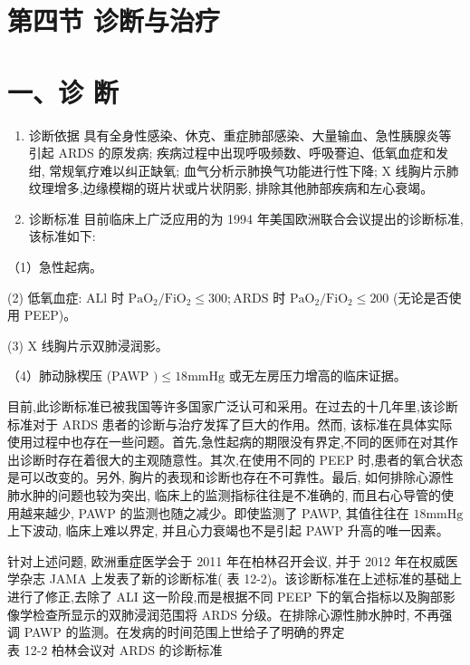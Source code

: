 \documentclass[10pt]{article}
\begin{document}
\section*{第四节 诊断与治疗}
\section*{一、诊 断}
\begin{enumerate}
  \item 诊断依据 具有全身性感染、休克、重症肺部感染、大量输血、急性胰腺炎等引起 ARDS 的原发病; 疾病过程中出现呼吸频数、呼吸謇迫、低氧血症和发绀, 常规氧疗难以纠正缺氧; 血气分析示肺换气功能进行性下降; X 线胸片示肺纹理增多,边缘模糊的斑片状或片状阴影, 排除其他肺部疾病和左心衰竭。

  \item 诊断标准 目前临床上广泛应用的为 1994 年美国欧洲联合会议提出的诊断标准,该标准如下:

\end{enumerate}

（1）急性起病。

(2) 低氧血症: $\mathrm{ALl}$ 时 $\mathrm{PaO}_{2} / \mathrm{FiO}_{2} \leqslant 300 ; \mathrm{ARDS}$ 时 $\mathrm{PaO}_{2} / \mathrm{FiO}_{2} \leqslant 200$ (无论是否使用 PEEP)。

(3) X 线胸片示双肺浸润影。

（4）肺动脉楔压 (PAWP $) \leqslant 18 \mathrm{mmHg}$ 或无左房压力增高的临床证据。

目前,此诊断标准已被我国等许多国家广泛认可和采用。在过去的十几年里,该诊断标准对于 ARDS 患者的诊断与治疗发挥了巨大的作用。然而, 该标准在具体实际使用过程中也存在一些问题。首先,急性起病的期限没有界定,不同的医师在对其作出诊断时存在着很大的主观随意性。其次,在使用不同的 PEEP 时,患者的氧合状态是可以改变的。另外, 胸片的表现和诊断也存在不可靠性。最后, 如何排除心源性肺水肿的问题也较为突出, 临床上的监测指标往往是不准确的, 而且右心导管的使用越来越少, PAWP 的监测也随之减少。即使监测了 PAWP, 其值往往在 $18 \mathrm{mmHg}$ 上下波动, 临床上难以界定, 并且心力衰竭也不是引起 PAWP 升高的唯一因素。

针对上述问题, 欧洲重症医学会于 2011 年在柏林召开会议, 并于 2012 年在权威医学杂志 JAMA 上发表了新的诊断标准( 表 12-2)。该诊断标准在上述标准的基础上进行了修正,去除了 ALI 这一阶段,而是根据不同 PEEP 下的氧合指标以及胸部影像学检查所显示的双肺浸润范围将 ARDS 分级。在排除心源性肺水肿时, 不再强调 PAWP 的监测。在发病的时间范围上世给子了明确的界定\\
表 12-2 柏林会议对 ARDS 的诊断标准
\end{document}
